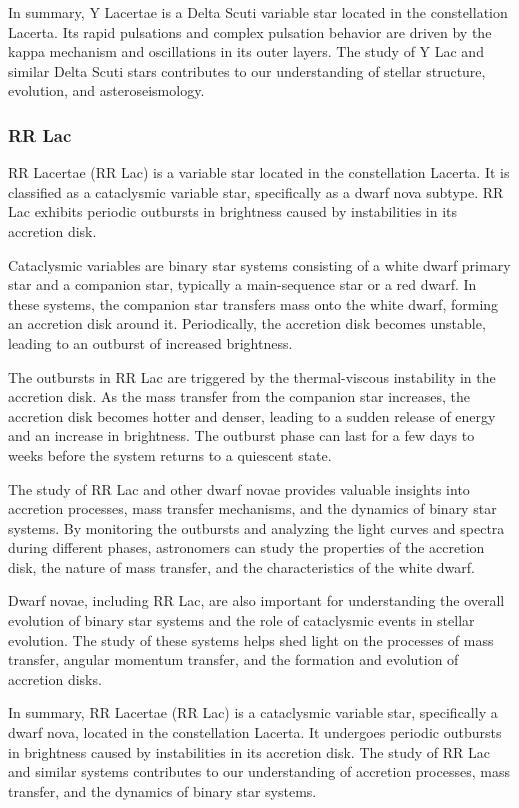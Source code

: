 In summary, Y Lacertae is a Delta Scuti variable star located in the constellation Lacerta. Its rapid pulsations and complex pulsation behavior are driven by the kappa mechanism and oscillations in its outer layers. The study of Y Lac and similar Delta Scuti stars contributes to our understanding of stellar structure, evolution, and asteroseismology.

\subsubsection*{ RR Lac }
RR Lacertae (RR Lac) is a variable star located in the constellation Lacerta. It is classified as a cataclysmic variable star, specifically as a dwarf nova subtype. RR Lac exhibits periodic outbursts in brightness caused by instabilities in its accretion disk.

Cataclysmic variables are binary star systems consisting of a white dwarf primary star and a companion star, typically a main-sequence star or a red dwarf. In these systems, the companion star transfers mass onto the white dwarf, forming an accretion disk around it. Periodically, the accretion disk becomes unstable, leading to an outburst of increased brightness.

The outbursts in RR Lac are triggered by the thermal-viscous instability in the accretion disk. As the mass transfer from the companion star increases, the accretion disk becomes hotter and denser, leading to a sudden release of energy and an increase in brightness. The outburst phase can last for a few days to weeks before the system returns to a quiescent state.

The study of RR Lac and other dwarf novae provides valuable insights into accretion processes, mass transfer mechanisms, and the dynamics of binary star systems. By monitoring the outbursts and analyzing the light curves and spectra during different phases, astronomers can study the properties of the accretion disk, the nature of mass transfer, and the characteristics of the white dwarf.

Dwarf novae, including RR Lac, are also important for understanding the overall evolution of binary star systems and the role of cataclysmic events in stellar evolution. The study of these systems helps shed light on the processes of mass transfer, angular momentum transfer, and the formation and evolution of accretion disks.

In summary, RR Lacertae (RR Lac) is a cataclysmic variable star, specifically a dwarf nova, located in the constellation Lacerta. It undergoes periodic outbursts in brightness caused by instabilities in its accretion disk. The study of RR Lac and similar systems contributes to our understanding of accretion processes, mass transfer, and the dynamics of binary star systems.


